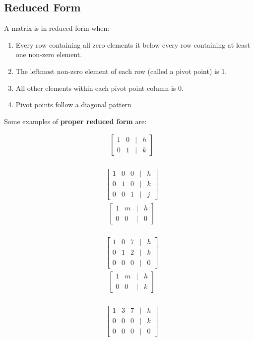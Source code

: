 \documentclass[14pt]{extarticle}
\begin{document}
\subsection*{Reduced Form}
A matrix is in reduced form when:
\begin{enumerate}[1)]
	\item Every row containing all zero elements it below every row containing at least one non-zero element.
	\item The leftmost non-zero element of each row (called a pivot point) is 1.
	\item All other elements within each pivot point column is 0.
	\item Pivot points follow a diagonal pattern
\end{enumerate}
\cleardoublepage
Some examples of \textbf{proper reduced form} are:
\begin{multicols}{3}
	\begin{align*}
		&\begin{bmatrix}
			1 & 0 & | & h\\
			0 & 1 & | & k
		\end{bmatrix} 
	\end{align*}
	\\
	\begin{align*}
		&\begin{bmatrix}
			1 & 0 & 0 & | & h\\
			0 & 1 & 0 & | & k \\
			0 & 0 & 1 & | & j
		\end{bmatrix} 
	\end{align*}
\vfill\null
\columnbreak
	\begin{align*}
		&\begin{bmatrix}
			1 & m & | & h\\
			0 & 0 & | & 0
		\end{bmatrix} 
	\end{align*}
	\\
	\begin{align*}
		&\begin{bmatrix}
			1 & 0 & 7 & | & h\\
			0 & 1 & 2 & | & k \\
			0 & 0 & 0 & | & 0
		\end{bmatrix} 
	\end{align*}
\vfill\null
\columnbreak
	\begin{align*}
		&\begin{bmatrix}
			1 & m & | & h\\
			0 & 0 & | & k
		\end{bmatrix} 
	\end{align*}
	\\
	\begin{align*}
		&\begin{bmatrix}
			1 & 3 & 7 & | & h\\
			0 & 0 & 0 & | & k \\
			0 & 0 & 0 & | & 0
		\end{bmatrix} 
	\end{align*}
\vfill\null
\end{multicols}
\end{document}
